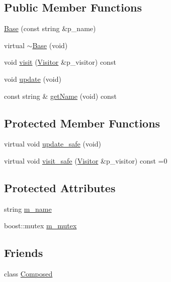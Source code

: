 \subsection*{Public Member Functions}
\begin{DoxyCompactItemize}
\item 
\hyperlink{classxtd_1_1counters_1_1Base_ab370a97f3a40bd529e871daedfce60c7}{Base} (const string \&p\-\_\-name)
\item 
virtual \hyperlink{classxtd_1_1counters_1_1Base_aa2bddc0c397ef1e77eff98969ba3bc7d}{$\sim$\-Base} (void)
\item 
void \hyperlink{classxtd_1_1counters_1_1Base_a0c743f0686dc24bada97c2ed31238c02}{visit} (\hyperlink{classxtd_1_1counters_1_1Visitor}{Visitor} \&p\-\_\-visitor) const 
\item 
void \hyperlink{classxtd_1_1counters_1_1Base_a5ba0d495403ba1ca4e1c6c30d8038dad}{update} (void)
\item 
const string \& \hyperlink{classxtd_1_1counters_1_1Base_a64ef0c0b30b420384494fd06c535f84d}{get\-Name} (void) const 
\end{DoxyCompactItemize}
\subsection*{Protected Member Functions}
\begin{DoxyCompactItemize}
\item 
virtual void \hyperlink{classxtd_1_1counters_1_1Base_a8b3d10c9fb2bea1d240f887bbe4008ea}{update\-\_\-safe} (void)
\item 
virtual void \hyperlink{classxtd_1_1counters_1_1Base_a0b8f3bdc6880dc03da750aa815dfdf0b}{visit\-\_\-safe} (\hyperlink{classxtd_1_1counters_1_1Visitor}{Visitor} \&p\-\_\-visitor) const =0
\end{DoxyCompactItemize}
\subsection*{Protected Attributes}
\begin{DoxyCompactItemize}
\item 
string \hyperlink{classxtd_1_1counters_1_1Base_ab07d4a6071bfa8263b24d5992bca6960}{m\-\_\-name}
\item 
boost\-::mutex \hyperlink{classxtd_1_1counters_1_1Base_aeeac2ffcae02eb6341418d708188a353}{m\-\_\-mutex}
\end{DoxyCompactItemize}
\subsection*{Friends}
\begin{DoxyCompactItemize}
\item 
class \hyperlink{classxtd_1_1counters_1_1Base_a93e934ad70d5b32b14beed5572450abf}{Composed}
\end{DoxyCompactItemize}


